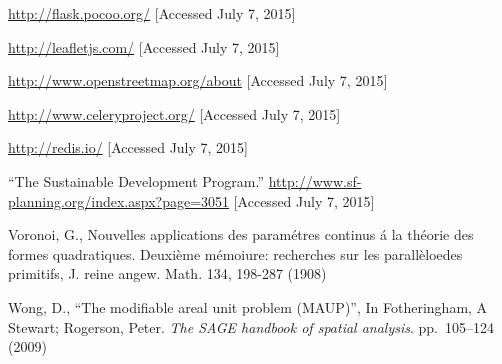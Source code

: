\documentclass[11pt]{article}
\begin{document}
\begin{thebibliography}{1}
\url{http://flask.pocoo.org/} [Accessed July 7, 2015]

\url{http://leafletjs.com/} [Accessed July 7, 2015]

\url{http://www.openstreetmap.org/about} [Accessed July 7, 2015]

\url{http://www.celeryproject.org/} [Accessed July 7, 2015]

\url{http://redis.io/} [Accessed July 7, 2015]

``The Sustainable Development Program.'' \url{http://www.sf-planning.org/index.aspx?page=3051} [Accessed July 7, 2015]

Voronoi, G., Nouvelles applications des param\'etres continus \'a la th\'eorie des formes quadratiques. Deuxi\`eme m\'emoiure: recherches sur les parall\`eloedes primitifs, J. reine angew. Math. 134, 198-287 (1908)

Wong, D., ``The modifiable areal unit problem (MAUP)'', In Fotheringham, A Stewart; Rogerson, Peter. \textit{The SAGE handbook of spatial analysis}. pp.~105--124 (2009)

\end{thebibliography}
\end{document}

